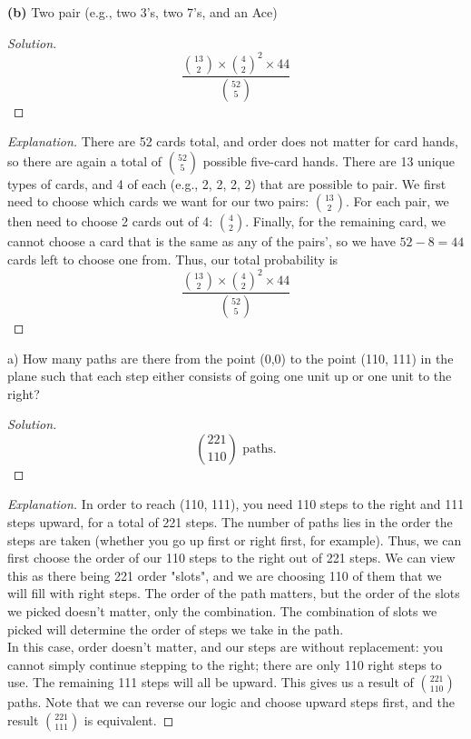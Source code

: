 \documentclass[10pt]{article}
\newenvironment{problem}[2][Problem]{\begin{trivlist}
\item[\hskip \labelsep {\bfseries #1}\hskip \labelsep {\bfseries #2.}]}{\end{trivlist}}
\begin{document}
\textbf{(b)} Two pair (e.g., two 3's, two 7's, and an Ace)

\begin{proof}[Solution]
\[
    \frac{\binom{13}{2} \times \binom{4}{2}^2 \times 44}{\binom{52}{5}}
\]
\end{proof}

\begin{proof}[Explanation]

There are 52 cards total, and order does not matter for card hands, so there are again a total of \(\binom{52}{5}\) possible five-card hands. There are 13 unique types of cards, and 4 of each (e.g., 2, 2, 2, 2) that are possible to pair. We first need to choose which cards we want for our two pairs: \(\binom{13}{2}\). For each pair, we then need to choose 2 cards out of 4: \(\binom{4}{2}\). Finally, for the remaining card, we cannot choose a card that is the same as any of the pairs', so we have $52 - 8 = 44$ cards left to choose one from. Thus, our total probability is
\[
    \frac{\binom{13}{2} \times \binom{4}{2}^2 \times 44}{\binom{52}{5}}
\]

\end{proof}


\begin{problem}{3} 
(a) How many paths are there from the point (0,0) to the point (110, 111) in the plane such that each step either consists of going one unit up or one unit to the right?
\end{problem}

\begin{proof}[Solution]
\[
     \binom{221}{110} \text{ paths.}
\]
\end{proof}

\begin{proof}[Explanation]

In order to reach (110, 111), you need 110 steps to the right and 111 steps upward, for a total of 221 steps. The number of paths lies in the order the steps are taken (whether you go up first or right first, for example). Thus, we can first choose the order of our 110 steps to the right out of 221 steps. We can view this as there being 221 order "slots", and we are choosing 110 of them that we will fill with right steps. The order of the path matters, but the order of the slots we picked doesn't matter, only the combination. The combination of slots we picked will determine the order of steps we take in the path. \\ 

In this case, order doesn't matter, and our steps are without replacement: you cannot simply continue stepping to the right; there are only 110 right steps to use. The remaining 111 steps will all be upward. This gives us a result of \(\binom{221}{110}\) paths. Note that we can reverse our logic and choose upward steps first, and the result \(\binom{221}{111}\) is equivalent.
\end{proof}
\end{document}
